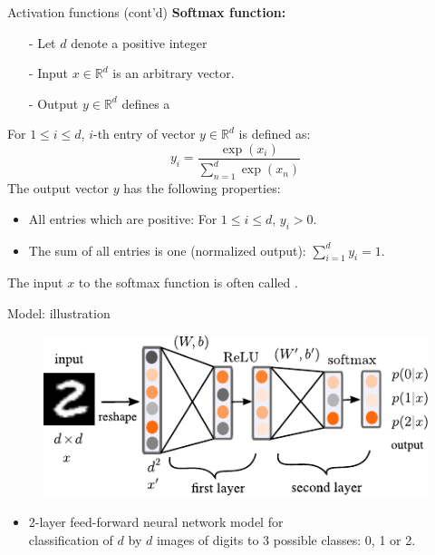 \begin{frame}{Activation functions (cont'd)}
\textbf{Softmax function:}\\
\vsp
\begin{itemize}
\item[-] Let $d$ denote a positive integer
\item[-] Input $x\in\mathbb{R}^d$ is an arbitrary vector.
\item[-] Output $y\in\mathbb{R}^d$ defines a 
\end{itemize}
\vsp
For $1 \leq i \leq d$, $i$-th entry of vector $y\in\mathbb{R}^d$ is defined as: 
\[
 y_i = \displaystyle \dfrac{\exp(x_i)}{\displaystyle \sum_{n=1}^{d} \exp(x_n)}
\]
\vsp
The output vector $y$ has the following properties:
\begin{itemize}
\item All entries which are positive: For $1 \leq i \leq d$, $y_i > 0$.
\item The sum of all entries is one (normalized output): $\displaystyle \sum_{i=1}^{d} y_i = 1$.
\end{itemize}
The input $x$ to the softmax function is often called .
\end{frame}

\begin{frame}{Model: illustration}
\begin{figure}
\centering
\includegraphics[width=0.90\linewidth]{./figures/nn_intro.pdf}
\end{figure}
\begin{itemize}
\item 2-layer feed-forward neural network model for\\
classification of $d$ by $d$ images of digits to 3 possible classes: 0, 1 or 2.
\end{itemize}
\end{frame}


